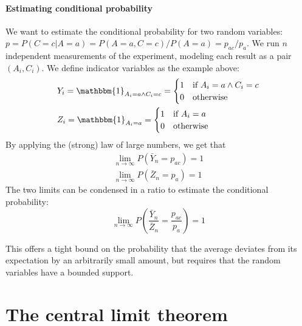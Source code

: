\paragraph{Estimating conditional probability} We want to estimate the conditional probability for two random variables: $p = P(C = c | A = a) = P(A=a, C=c)/P(A=a) = p_{ac}/p_a$. We run $n$ independent measurements of the experiment, modeling each result as a pair $(A_i, C_i)$. We define indicator variables as the example above:
\begin{align*}
    &Y_i = \mathbbm{1}_{A_i = a \land C_i = c} = \begin{cases}
        1 & \text{if } A_i = a \land C_i = c\\
        0 & \text{otherwise}
    \end{cases}\\
    &Z_i = \mathbbm{1}_{A_i = a} = \begin{cases}
        1 & \text{if } A_i = a\\
        0 & \text{otherwise}
    \end{cases}
\end{align*}
By applying the (strong) law of large numbers, we get that
\begin{align*}
    \lim_{n \to \infty} P(\bar{Y}_n = p_{ac}) = 1 \\
    \lim_{n \to \infty} P(\bar{Z}_n = p_a) = 1
\end{align*}
The two limits can be condensed in a ratio to estimate the conditional probability:
\begin{equation*}
    \lim_{n \to \infty} P(\frac{\bar{Y}_n}{\bar{Z}_n} = \frac{p_{ac}}{p_a}) = 1
\end{equation*}

This offers a tight bound on the probability that the average deviates from its expectation by an arbitrarily small amount, but requires that the random variables have a bounded support.

\section{The central limit theorem}

